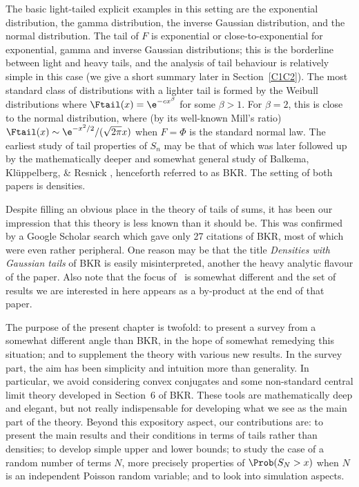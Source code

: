 The basic light-tailed explicit examples in this setting are the exponential distribution, the gamma distribution,
the inverse Gaussian distribution,  and the normal distribution. The tail of $F$ is exponential or close-to-exponential for exponential, gamma and inverse Gaussian distributions; this is the borderline between light and heavy tails, and the analysis of tail behaviour is relatively simple in this case (we give a short summary
later in Section~\ref{C1C2}).
The most standard class of distributions with a lighter tail is formed by the Weibull distributions where
$\Ftail(x)=\e^{-cx^\beta}$ for some $\beta>1$. For $\beta=2$, this is close to the normal distribution, where (by its well-known Mill's ratio) $\Ftail(x)\sim \e^{-x^2/2}/(\sqrt{2\pi}x)$ when $F = \Phi$ is the standard normal law. The earliest study of  tail properties of $S_n$ may be that
of \cite{rootzen1987ratio} which was later followed up by the mathematically deeper and somewhat general study of Balkema, Kl\"uppelberg, \& Resnick \cite{balkema1993densities}, henceforth referred to as BKR. The setting of both papers is densities.

Despite filling an obvious place in the theory of  tails of sums, it has been our impression that this theory is less known
than it should be. This was confirmed by a Google Scholar search which gave only 27 citations of BKR,
most of which were even rather peripheral.
One reason may be that the title \emph{Densities with Gaussian tails} of BKR is easily misinterpreted,
another the heavy analytic flavour of the paper. Also note that the focus of~\cite{rootzen1987ratio} is somewhat different and
the set of results we are interested in here appears as a by-product at the end of that paper.

The purpose of the present chapter is twofold: to present a survey from a somewhat different angle than BKR, in the
hope of somewhat remedying this situation; and to supplement the theory with various new results.
In the survey part, the aim has been  simplicity and intuition more than generality.
In particular, we avoid considering convex conjugates and some non-standard
central limit theory developed in Section~6 of BKR. These tools are mathematically deep and elegant, but
not really indispensable for developing what we see as the main part of the theory.
Beyond this expository aspect, our contributions are: to present the main results and their conditions
in terms of  tails rather than densities;  to develop simple upper and lower
bounds; to study the case of a random
number of terms $N$, more precisely properties of $\Prob(S_N>x)$
when $N$ is an independent Poisson random variable; and to look into simulation
aspects.

